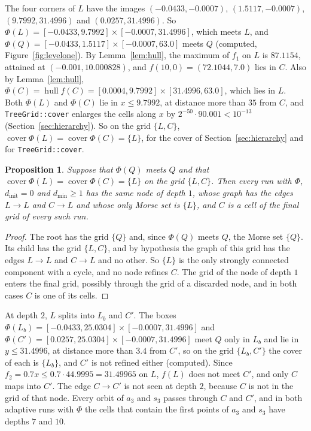 \documentclass[11pt]{article}
\theoremstyle{plain}
\newtheorem{proposition}{Proposition}[section]
\theoremstyle{definition}
\theoremstyle{remark}
\DeclareMathOperator{\cover}{cover}
\DeclareMathOperator{\hull}{hull}
\newcommand{\dmin}{d_{\min}}
\newcommand{\dinit}{d_{\mathrm{init}}}
\newcommand{\code}[1]{\texttt{#1}}
\begin{document}
The four corners of $L$ have the images $(-0.0433,-0.0007)$, $(1.5117,-0.0007)$, $(9.7992,31.4996)$ and $(0.0257,31.4996)$. So $\Phi(L)=[-0.0433,9.7992]\times[-0.0007,31.4996]$, which meets $L$, and $\Phi(Q)=[-0.0433,1.5117]\times[-0.0007,63.0]$ meets $Q$ (computed, Figure~\ref{fig:levelone}). By Lemma~\ref{lem:hull}, the maximum of $f_1$ on $L$ is $87.1154$, attained at $(-0.001,10.000828)$, and $f(10,0)=(72.1044,7.0)$ lies in $C$. Also by Lemma~\ref{lem:hull}, $\Phi(C)=\hull f(C)=[0.0004,9.7992]\times[31.4996,63.0]$, which lies in $L$. Both $\Phi(L)$ and $\Phi(C)$ lie in $x\leq9.7992$, at distance more than $35$ from $C$, and \code{TreeGrid::cover} enlarges the cells along $x$ by $2^{-50}\cdot90.001<10^{-13}$ (Section~\ref{sec:hierarchy}). So on the grid $\{L,C\}$, $\cover\Phi(L)=\cover\Phi(C)=\{L\}$, for the cover of Section~\ref{sec:hierarchy} and for \code{TreeGrid::cover}.

\begin{proposition}\label{prop:depthone}
Suppose that $\Phi(Q)$ meets $Q$ and that $\cover\Phi(L)=\cover\Phi(C)=\{L\}$ on the grid $\{L,C\}$. Then every run with $\Phi$, $\dinit=0$ and $\dmin\geq1$ has the same node of depth $1$, whose graph has the edges $L\to L$ and $C\to L$ and whose only Morse set is $\{L\}$, and $C$ is a cell of the final grid of every such run.
\end{proposition}

\begin{proof}
The root has the grid $\{Q\}$ and, since $\Phi(Q)$ meets $Q$, the Morse set $\{Q\}$. Its child has the grid $\{L,C\}$, and by hypothesis the graph of this grid has the edges $L\to L$ and $C\to L$ and no other. So $\{L\}$ is the only strongly connected component with a cycle, and no node refines $C$. The grid of the node of depth $1$ enters the final grid, possibly through the grid of a discarded node, and in both cases $C$ is one of its cells.
\end{proof}

At depth $2$, $L$ splits into $L_b$ and $C'$. The boxes $\Phi(L_b)=[-0.0433,25.0304]\times[-0.0007,31.4996]$ and $\Phi(C')=[0.0257,25.0304]\times[-0.0007,31.4996]$ meet $Q$ only in $L_b$ and lie in $y\leq31.4996$, at distance more than $3.4$ from $C'$, so on the grid $\{L_b,C'\}$ the cover of each is $\{L_b\}$, and $C'$ is not refined either (computed). Since $f_2=0.7x\leq0.7\cdot44.9995=31.49965$ on $L$, $f(L)$ does not meet $C'$, and only $C$ maps into $C'$. The edge $C\to C'$ is not seen at depth $2$, because $C$ is not in the grid of that node. Every orbit of $a_3$ and $s_3$ passes through $C$ and $C'$, and in both adaptive runs with $\Phi$ the cells that contain the first points of $a_3$ and $s_3$ have depths $7$ and $10$.
\end{document}
